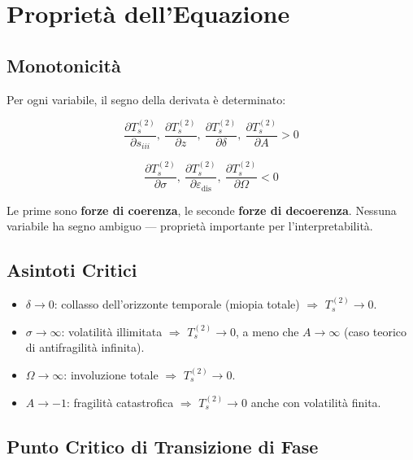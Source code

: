 \section{Proprietà dell'Equazione}\label{proprietuxe0-dellequazione}

\subsection{Monotonicità}\label{monotonicituxe0}

\Proved{} Per ogni variabile, il segno della derivata è determinato:

\[
\frac{\partial T_s^{(2)}}{\partial s_{iii}},\ \frac{\partial T_s^{(2)}}{\partial z},\ \frac{\partial T_s^{(2)}}{\partial \delta},\ \frac{\partial T_s^{(2)}}{\partial A} > 0
\]

\[
\frac{\partial T_s^{(2)}}{\partial \sigma},\ \frac{\partial T_s^{(2)}}{\partial \varepsilon_{\text{dis}}},\ \frac{\partial T_s^{(2)}}{\partial \Omega} < 0
\]

Le prime sono \textbf{forze di coerenza}, le seconde \textbf{forze di
decoerenza}. Nessuna variabile ha segno ambiguo --- proprietà importante
per l'interpretabilità.

\subsection{Asintoti Critici}\label{asintoti-critici}

\begin{itemize}
\tightlist
\item
  \(\delta \to 0\): collasso dell'orizzonte temporale (miopia totale) $\Rightarrow$
  \(T_s^{(2)} \to 0\).
\item
  \(\sigma \to \infty\): volatilità illimitata $\Rightarrow$ \(T_s^{(2)} \to 0\), a
  meno che \(A \to \infty\) (caso teorico di antifragilità infinita).
\item
  \(\Omega \to \infty\): involuzione totale $\Rightarrow$ \(T_s^{(2)} \to 0\).
\item
  \(A \to -1\): fragilità catastrofica $\Rightarrow$ \(T_s^{(2)} \to 0\) anche con
  volatilità finita.
\end{itemize}

\subsection{Punto Critico di Transizione di
Fase}\label{punto-critico-di-transizione-di-fase}

